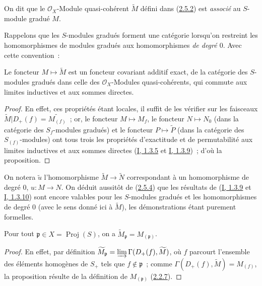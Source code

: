 \begin{definition}[2.5.3]
\label{II.2.5.3-fr}
On dit que le $\mathcal{O}_X$-Module quasi-cohérent $\widetilde{M}$ défini
dans (\hyperref[II.2.5.2-fr]{2.5.2}) est \emph{associé} au $S$-module
gradué $M$.
\end{definition}

Rappelons que les $S$-modules gradués forment une catégorie lorsqu'on
restreint les homomorphismes de modules gradués aux homomorphismes
\emph{de degré $0$}. Avec cette convention~:

\begin{proposition}[2.5.4]
\label{II.2.5.4-fr}
Le foncteur $M\mapsto\widetilde{M}$ est un foncteur covariant additif exact,
de la catégorie des $S$-modules gradués dans celle des
$\mathcal{O}_X$-Modules quasi-cohérents, qui commute aux limites
inductives et aux sommes directes.
\end{proposition}

\begin{proof}
En effet, ces propriétés étant locales, il suffit de les vérifier sur les
faisceaux
$\widetilde{M}|D_+(f)=\widetilde{M_{(f)}}$~; or, le foncteur
$M\mapsto M_f$, le foncteur $N\mapsto N_0$ (dans la catégorie des
$S_f$-modules gradués) et le foncteur $P\mapsto\widetilde{P}$ (dans la
catégorie des $S_{(f)}$-modules) ont tous trois les propriétés d'exactitude
et de permutabilité aux limites inductives et aux sommes directes
(\hyperref[I.1.3.5-fr]{I, 1.3.5} et
\hyperref[I.1.3.9-fr]{I, 1.3.9})~; d'où la proposition.
\end{proof}

On notera $\widetilde{u}$ l'homomorphisme
$\widetilde{M}\to\widetilde{N}$ correspondant à un homomorphisme de degré
$0$, $u:M\to N$. On déduit aussitôt de
(\hyperref[II.2.5.4-fr]{2.5.4}) que les résultats de
(\hyperref[I.1.3.9-fr]{I, 1.3.9} et
\hyperref[I.1.3.10-fr]{I, 1.3.10}) sont encore valables pour les
$S$-modules gradués et les homomorphismes de degré $0$ (avec le sens donné
ici à $\widetilde{M}$), les démonstrations étant purement formelles.

\begin{proposition}[2.5.5]
\label{II.2.5.5-fr}
Pour tout $\mathfrak{p}\in X=\operatorname{Proj}(S)$, on a
$\widetilde{M}_{\mathfrak{p}}=M_{(\mathfrak{p})}$.
\end{proposition}

\begin{proof}
En effet, par définition
$\widetilde{M}_{\mathfrak{p}}=
\varinjlim\Gamma(D_+(f),\widetilde{M})$, où $f$ parcourt l'ensemble des
éléments homogènes de $S_+$ tels que $f\notin\mathfrak{p}$~; comme
$\Gamma(D_+(f),\widetilde{M})=M_{(f)}$, la proposition résulte de la
définition de $M_{(\mathfrak{p})}$
(\hyperref[II.2.2.7-fr]{2.2.7}).
\end{proof}

